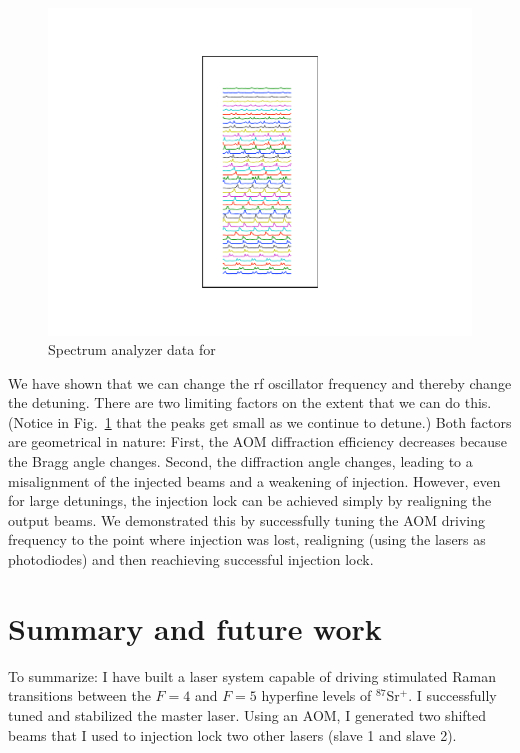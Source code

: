 \begin{figure}
\centerline{\includegraphics{all_splittingData}}
\caption[]{\label{fig:alldata} 
Spectrum analyzer data for }
\end{figure}


We have shown that we can change the rf oscillator frequency and thereby change the detuning. There are two limiting factors on the extent that we can do this. (Notice in Fig.\ \ref{fig:alldata} that the peaks get small as we continue to detune.) Both factors are geometrical in nature: First, the AOM diffraction efficiency decreases because the Bragg angle changes. Second, the diffraction angle changes, leading to a misalignment of the injected beams and a weakening of injection. However, even for large detunings, the injection lock can be achieved simply by realigning the output beams. We demonstrated this by successfully tuning the AOM driving frequency to the point where injection was lost, realigning (using the lasers as photodiodes) and then reachieving successful injection lock.

\section{Summary and future work}
To summarize: I have built a laser system capable of driving stimulated Raman transitions between the $F=4$ and $F=5$ hyperfine levels of $^{87}$Sr$^+$. I successfully tuned and stabilized the master laser. Using an AOM, I generated two shifted beams that I used to injection lock two other lasers (slave 1 and slave 2).

